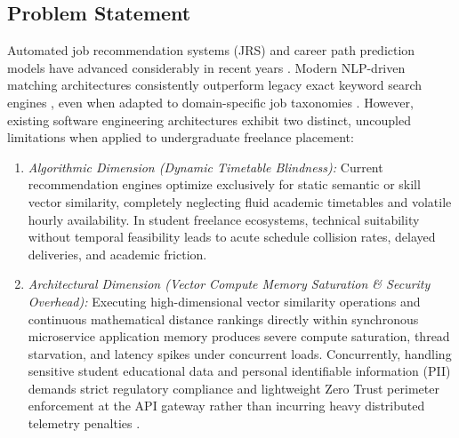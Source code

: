 \documentclass[a4paper,fleqn]{cas-dc}
\begin{document}
\subsection{Problem Statement}
Automated job recommendation systems (JRS) and career path prediction models have advanced considerably in recent years \cite{song2022}. Modern NLP-driven matching architectures consistently outperform legacy exact keyword search engines \cite{alsaif2022}, even when adapted to domain-specific job taxonomies \cite{rebaza2025}. However, existing software engineering architectures exhibit two distinct, uncoupled limitations when applied to undergraduate freelance placement:
\begin{enumerate}
    \item \textit{Algorithmic Dimension (Dynamic Timetable Blindness):} Current recommendation engines optimize exclusively for static semantic or skill vector similarity, completely neglecting fluid academic timetables and volatile hourly availability. In student freelance ecosystems, technical suitability without temporal feasibility leads to acute schedule collision rates, delayed deliveries, and academic friction.
    \item \textit{Architectural Dimension (Vector Compute Memory Saturation \& Security Overhead):} Executing high-dimensional vector similarity operations and continuous mathematical distance rankings directly within synchronous microservice application memory produces severe compute saturation, thread starvation, and latency spikes under concurrent loads. Concurrently, handling sensitive student educational data and personal identifiable information (PII) demands strict regulatory compliance \cite{ley29733, dl1270} and lightweight Zero Trust perimeter enforcement at the API gateway rather than incurring heavy distributed telemetry penalties \cite{alboqmi2025}.
\end{enumerate}
\end{document}
